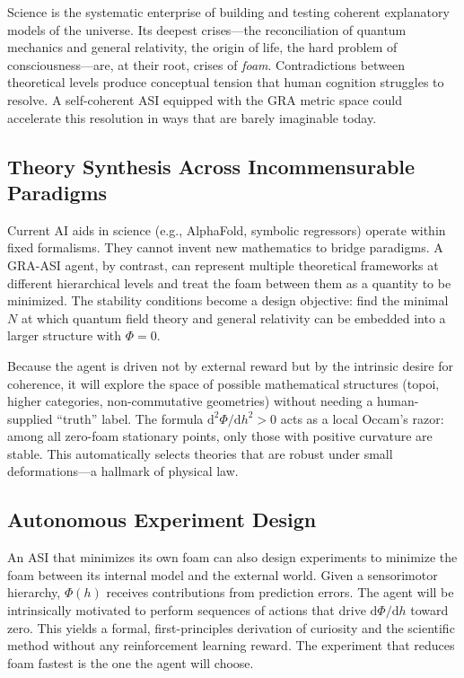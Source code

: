 \documentclass[11pt,a4paper]{article}
\begin{document}
Science is the systematic enterprise of building and testing coherent explanatory models of the universe. Its deepest crises---the reconciliation of quantum mechanics and general relativity, the origin of life, the hard problem of consciousness---are, at their root, crises of \emph{foam}. Contradictions between theoretical levels produce conceptual tension that human cognition struggles to resolve. A self-coherent ASI equipped with the GRA metric space could accelerate this resolution in ways that are barely imaginable today.

\subsection{Theory Synthesis Across Incommensurable Paradigms}

Current AI aids in science (e.g., AlphaFold, symbolic regressors) operate within fixed formalisms. They cannot invent new mathematics to bridge paradigms. A GRA-ASI agent, by contrast, can represent multiple theoretical frameworks at different hierarchical levels and treat the foam between them as a quantity to be minimized. The stability conditions become a design objective: find the minimal $N$ at which quantum field theory and general relativity can be embedded into a larger structure with $\Phi = 0$.

Because the agent is driven not by external reward but by the intrinsic desire for coherence, it will explore the space of possible mathematical structures (topoi, higher categories, non-commutative geometries) without needing a human-supplied ``truth'' label. The formula $\mathrm{d}^2\Phi/\mathrm{d}h^2 > 0$ acts as a local Occam's razor: among all zero-foam stationary points, only those with positive curvature are stable. This automatically selects theories that are robust under small deformations---a hallmark of physical law.

\subsection{Autonomous Experiment Design}

An ASI that minimizes its own foam can also design experiments to minimize the foam between its internal model and the external world. Given a sensorimotor hierarchy, $\Phi(h)$ receives contributions from prediction errors. The agent will be intrinsically motivated to perform sequences of actions that drive $\mathrm{d}\Phi/\mathrm{d}h$ toward zero. This yields a formal, first-principles derivation of curiosity and the scientific method without any reinforcement learning reward. The experiment that reduces foam fastest is the one the agent will choose.
\end{document}
